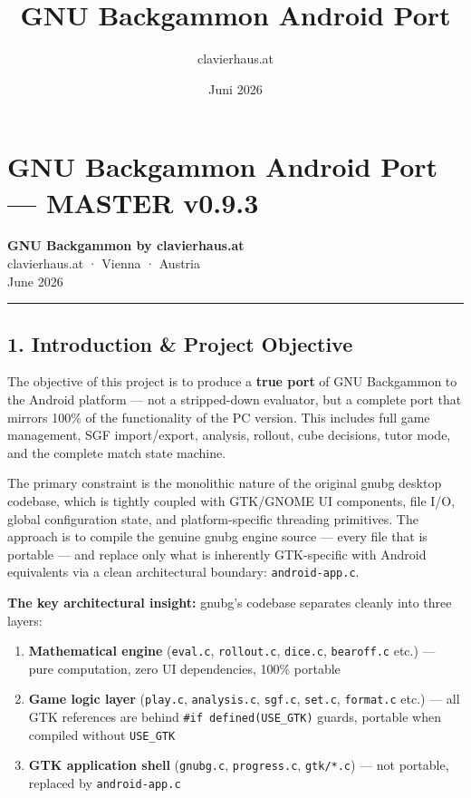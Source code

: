\documentclass[11pt,a4paper]{article}
\title{\textbf{GNU Backgammon Android Port}}
\author{clavierhaus.at}
\date{Juni 2026}
\providecommand{\tightlist}{\setlength{\itemsep}{2pt}\setlength{\parskip}{0pt}}
\begin{document}
\maketitle\thispagestyle{fancy}

\tableofcontents\newpage

\section{GNU Backgammon Android Port --- MASTER v0.9.3}\label{gnu-backgammon-android-port-master-v09}

\textbf{GNU Backgammon by clavierhaus.at}\\
clavierhaus.at · Vienna · Austria\\
June 2026

\begin{center}\rule{0.5\linewidth}{0.5pt}\end{center}

\subsection{1. Introduction \& Project
Objective}\label{introduction-project-objective}

The objective of this project is to produce a \textbf{true port} of GNU
Backgammon to the Android platform --- not a stripped-down evaluator,
but a complete port that mirrors 100\% of the functionality of the PC
version. This includes full game management, SGF import/export,
analysis, rollout, cube decisions, tutor mode, and the complete match
state machine.

The primary constraint is the monolithic nature of the original gnubg
desktop codebase, which is tightly coupled with GTK/GNOME UI components,
file I/O, global configuration state, and platform-specific threading
primitives. The approach is to compile the genuine gnubg engine source
--- every file that is portable --- and replace only what is inherently
GTK-specific with Android equivalents via a clean architectural
boundary: \texttt{android-app.c}.

\textbf{The key architectural insight:} gnubg's codebase separates
cleanly into three layers:

\begin{enumerate}
\def\labelenumi{\arabic{enumi}.}
\tightlist
\item
  \textbf{Mathematical engine} (\texttt{eval.c}, \texttt{rollout.c},
  \texttt{dice.c}, \texttt{bearoff.c} etc.) --- pure computation, zero
  UI dependencies, 100\% portable
\item
  \textbf{Game logic layer} (\texttt{play.c}, \texttt{analysis.c},
  \texttt{sgf.c}, \texttt{set.c}, \texttt{format.c} etc.) --- all GTK
  references are behind \texttt{\#if\ defined(USE\_GTK)} guards,
  portable when compiled without \texttt{USE\_GTK}
\item
  \textbf{GTK application shell} (\texttt{gnubg.c}, \texttt{progress.c},
  \texttt{gtk/*.c}) --- not portable, replaced by \texttt{android-app.c}
\end{enumerate}
\end{document}

